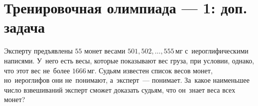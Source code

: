 
\section*{Тренировочная олимпиада --- 1: доп. задача}




\begin{problems}

\item
Эксперту предъявлены $55$ монет весами $501, 502, \ldots, 555\,\text{мг}$
с~иероглифическими написями.
У~него есть весы, которые показывают вес груза, при условии, однако, что этот вес
не~более $1666\,\text{мг}$.
Судьям известен список весов монет, но~иероглифов они не~понимают,
а~эксперт~--- понимает.
За~какое наименьшее число взвешиваний эксперт сможет доказать судьям, что он~знает
веса всех монет?

\end{problems}

